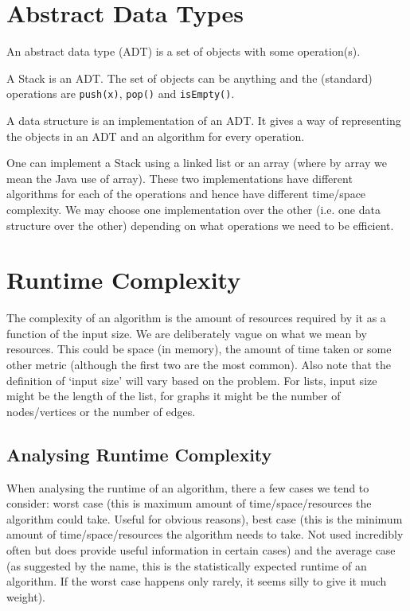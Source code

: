 \section{Abstract Data Types}
\begin{definition}
An abstract data type (ADT) is a set of objects with some operation(s).
\end{definition}
\begin{example}
A Stack is an ADT. The set of objects can be anything and the (standard) operations are \texttt{push(x)}, \texttt{pop()} and \texttt{isEmpty()}.
\end{example}

\begin{definition}
A data structure is an implementation of an ADT. It gives a way of representing the objects in an ADT and an algorithm for every operation.
\end{definition}
One can implement a Stack using a linked list or an array (where by array we mean the Java use of array). These two implementations have different algorithms for each of the operations and hence have different time/space complexity. We may choose one implementation over the other (i.e. one data structure over the other) depending on what operations we need to be efficient.

\section{Runtime Complexity}
The complexity of an algorithm is the amount of resources required by it as a function of the input size. We are deliberately vague on what we mean by resources. This could be space (in memory), the amount of time taken or some other metric (although the first two are the most common). Also note that the definition of `input size' will vary based on the problem. For lists, input size might be the length of the list, for graphs it might be the number of nodes/vertices or the number of edges.

\subsection{Analysing Runtime Complexity}
When analysing the runtime of an algorithm, there a few cases we tend to consider: worst case (this is maximum amount of time/space/resources the algorithm could take. Useful for obvious reasons), best case (this is the minimum amount of time/space/resources the algorithm needs to take. Not used incredibly often but does provide useful information in certain cases) and the average case (as suggested by the name, this is the statistically expected runtime of an algorithm. If the worst case happens only rarely, it seems silly to give it much weight).

